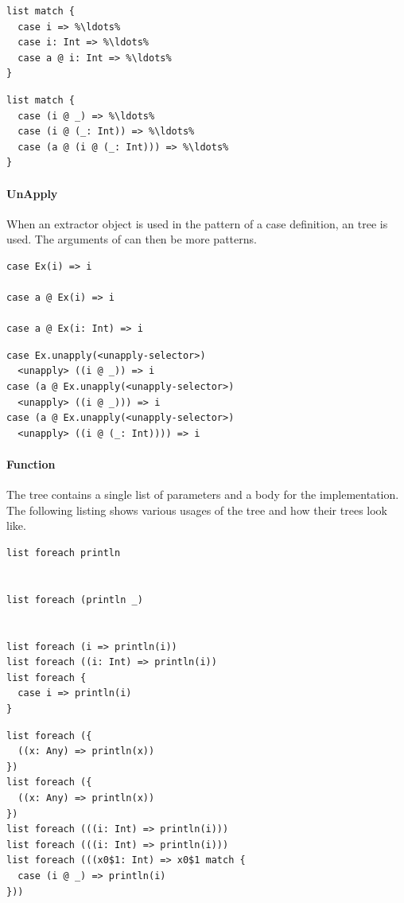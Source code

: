 \begin{multicols}{2}
\begin{lstlisting}
list match {
  case i => %\ldots%
  case i: Int => %\ldots%
  case a @ i: Int => %\ldots%
}
\end{lstlisting}
\begin{lstlisting}
list match {
  case (i @ _) => %\ldots%
  case (i @ (_: Int)) => %\ldots%
  case (a @ (i @ (_: Int))) => %\ldots% 
}
\end{lstlisting}
\end{multicols}

\paragraph{UnApply} 

\noindent When an extractor object is used in the pattern of a case definition, an  tree is used. The arguments of  can then be more  patterns.

\begin{multicols}{2}
\begin{lstlisting}
case Ex(i) => i

case a @ Ex(i) => i

case a @ Ex(i: Int) => i

\end{lstlisting}
\begin{lstlisting}
case Ex.unapply(<unapply-selector>) 
  <unapply> ((i @ _)) => i
case (a @ Ex.unapply(<unapply-selector>) 
  <unapply> ((i @ _))) => i
case (a @ Ex.unapply(<unapply-selector>) 
  <unapply> ((i @ (_: Int)))) => i
\end{lstlisting}
\end{multicols}

\paragraph{Function} 

\noindent The  tree contains a single list of parameters and a body for the implementation. The following listing shows various usages of the  tree and how their trees look like.

\begin{multicols}{2}
\begin{lstlisting}
list foreach println


list foreach (println _)


list foreach (i => println(i))
list foreach ((i: Int) => println(i))
list foreach {
  case i => println(i)
}
\end{lstlisting}
\begin{lstlisting}
list foreach ({
  ((x: Any) => println(x))
})
list foreach ({
  ((x: Any) => println(x))
})
list foreach (((i: Int) => println(i)))
list foreach (((i: Int) => println(i)))
list foreach (((x0$1: Int) => x0$1 match {
  case (i @ _) => println(i)
}))
\end{lstlisting}
\end{multicols}

